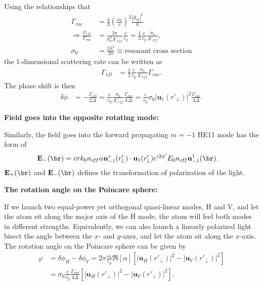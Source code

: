 \documentclass[]{report}
\begin{document}
Using the relationships that 
\begin{align}
\Gamma_{vac} &= \frac{4}{3} \left( \frac{\omega_0}{c}\right)^3 \frac{|d_{eg}|^2}{\hbar}\\
\Rightarrow \frac{\Gamma_{1\!D}}{\Gamma_{vac}} &= \frac{3\pi}{k_0^2A'_{e\!f\!f}} \frac{c}{v_g} = \frac{1}{2} \frac{c}{v_g} \frac{\sigma_0}{A'_{e\!f\!f}},\\
\sigma_0 &= \frac{3\lambda^2}{2\pi} \equiv \text{resonant cross section}
\end{align}
the 1-dimensional scattering rate can be written as 
\begin{align}
\Gamma_{1\!D} &= \frac{1}{2} \frac{c}{v_g} \frac{\sigma_0}{A'_{e\!f\!f}}\Gamma_{vac}.
\end{align}
The phase shift is then
\begin{align}
\delta\phi &= -\frac{\Gamma_{1\!D}}{2\Delta} = \frac{c}{v_g} \frac{\sigma_0 }{A'_{e\!f\!f}} \frac{\Gamma_{vac}}{4\Delta} = \frac{c}{v_g} \sigma_0 |\mathbf{u}_1 (r'_{\!\perp})|^2 \frac{\Gamma_{vac}}{4\Delta}.
\end{align}

\bigskip
\textbf{Field goes into the opposite rotating mode:}

Similarly, the field goes into the forward propagating $ m=-1 $ HE11 mode has the form of 
\begin{align}
\mathbf{E}_{-}(\br) &=  i\pi k_0 n_{e\!f\!f}\alpha  \mathbf{u}^*_{-1}(r'_{\!\perp})\cdot \mathbf{u}_1(r'_{\!\perp})e^{i2\phi'}E_0n_{e\!f\!f}\mathbf{u}_{-1}^1(\br).
\end{align}
$ \mathbf{E}_{+}(\br) $ and $\mathbf{E}_{-}(\br)$ defines the transformation of polarization of the light. 

\bigskip
\textbf{The rotation angle on the Poincare sphere:}

If we launch two equal-power yet orthogonal quasi-linear modes, H and V, and let the atom sit along the major axis of the H mode, the atom will feel both modes in different strengths. Equivalently, we can also launch a linearly polarized light bisect the angle between the $ x $- and $ y $-axes, and let the atom sit along the $ x $-axis. The rotation angle on the Poincare sphere can be given by
\begin{align}
\varphi &= \delta\phi_H-\delta\phi_V= 2\pi \frac{\omega_0}{v_g} \Re[\alpha] \left[| \mathbf{u}_H(r'_{\!\perp})|^2- | \mathbf{u}_V(r'_{\!\perp})|^2 \right]\\
&= \sigma_0\frac{c}{v_g}\frac{\Gamma_{vac}}{4\Delta}\left[| \mathbf{u}_H(r'_{\!\perp})|^2- | \mathbf{u}_V(r'_{\!\perp})|^2 \right].\label{eq:Faradayrotang}
\end{align}
\end{document}
